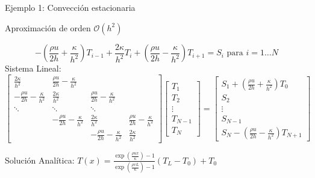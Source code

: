 \documentclass{beamer}
\begin{document}
\begin{frame}{Ejemplo 1: Convección estacionaria}
%
\begin{center}
	Aproximación de orden $\mathcal{O}(h^2)$
\end{center}
%
\[
\boxed{
	-\left(\frac{\rho u}{2h} + \frac{\kappa}{h^2}\right) T_{i-1} +
	\frac{2\kappa}{h^2} T_i +
	\left(\frac{\rho u}{2h} - \frac{\kappa}{h^2}\right) T_{i+1} = S_i} \text{ para } i = 1 \dots N
\]
%
Sistema Lineal:
{\scriptsize 
	\[
	\left[
	\begin{array}{cccccc}
	\frac{2 \kappa}{h^2} & \frac{\rho u}{2 h} - \frac{\kappa}{h^2}   \\
	-\frac{\rho u}{2 h} - \frac{\kappa}{h^2} & \frac{2 \kappa}{h^2} & \frac{\rho u}{2 h} - \frac{\kappa}{h^2} \\
	\ddots & \ddots & \ddots &  \\
	&  -\frac{\rho u}{2 h} - \frac{\kappa}{h^2} & \frac{2 \kappa}{h^2} & \frac{\rho u}{2 h} - \frac{\kappa}{h^2}\\
	&  & -\frac{\rho u}{2 h} - \frac{\kappa}{h^2} & \frac{2 \kappa}{h^2} 
	\end{array}
	\right]
	\left[
	\begin{array}{c}
	T_1 \\ T_2 \\ \vdots \\ T_{N-1} \\ T_{N}
	\end{array}
	\right] =
	\left[
	\begin{array}{c}
	S_1 + \left(\frac{\rho u}{2 h} + \frac{\kappa}{h^2}\right)T_0 \\ 
	S_2 \\ 
	\vdots \\ 
	S_{N-1} \\ 
	S_{N} - \left(\frac{\rho u}{2 h} - \frac{\kappa}{h^2}\right)T_{N+1}
	\end{array}
	\right]
	\]
}

\strut
 
{\footnotesize Solución Analítica:
$\displaystyle
\boxed{
T(x) = \frac{\exp\left(\frac{\rho u x}{\kappa}\right) - 1 }{\exp\left(\frac{\rho v L}{\kappa}\right) - 1} (T_L - T_0) + T_0}
$}
\end{frame}
\end{document}
